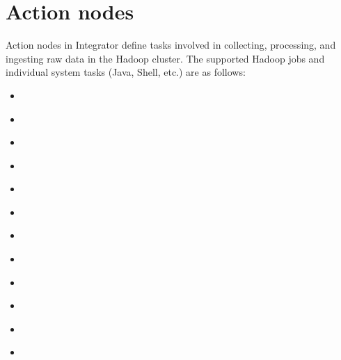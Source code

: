 \documentclass[letterpaper,10pt,english]{sphinxmanual}
\begin{document}
\section{Action nodes}
\label{\detokenize{integrator/part03/tasks:action-nodes}}\label{\detokenize{integrator/part03/tasks:id1}}\label{\detokenize{integrator/part03/tasks::doc}}
Action nodes in Integrator define tasks involved in collecting, processing, and ingesting raw data in the Hadoop cluster. The supported Hadoop jobs and individual system tasks (Java, Shell, etc.) are as follows:
\begin{itemize}
\item {} 
{\hyperref[\detokenize{integrator/part03/tasks:sqoop}]{}}

\item {} 
{\hyperref[\detokenize{integrator/part03/tasks:mr}]{}}

\item {} 
{\hyperref[\detokenize{integrator/part03/tasks:exec}]{}}

\item {} 
{\hyperref[\detokenize{integrator/part03/tasks:java}]{}}

\item {} 
{\hyperref[\detokenize{integrator/part03/tasks:hive-query}]{}}

\item {} 
{\hyperref[\detokenize{integrator/part03/tasks:ssh}]{}}

\item {} 
{\hyperref[\detokenize{integrator/part03/tasks:spark}]{}}

\item {} 
{\hyperref[\detokenize{integrator/part03/tasks:sub-workflow}]{}}

\item {} 
{\hyperref[\detokenize{integrator/part03/tasks:distcp}]{}}

\item {} 
{\hyperref[\detokenize{integrator/part03/tasks:hdfs}]{}}

\item {} 
{\hyperref[\detokenize{integrator/part03/tasks:done}]{}}

\item {} 
{\hyperref[\detokenize{integrator/part03/tasks:druid}]{}}

\end{itemize}
\end{document}
